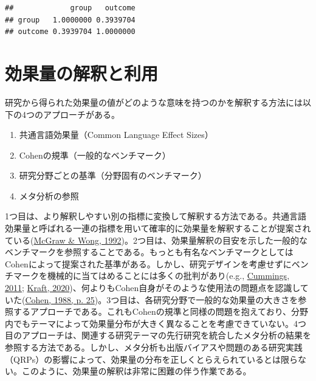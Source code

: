 \documentclass[
  ja=standard, xelatex, base=12pt]{bxjsreport}
\newenvironment{Shaded}{\begin{snugshade}}{\end{snugshade}}
\newcommand{\DecValTok}[1]{\textcolor[rgb]{0.00,0.00,0.81}{#1}}
\newcommand{\FunctionTok}[1]{\textcolor[rgb]{0.00,0.00,0.00}{#1}}
\newcommand{\NormalTok}[1]{#1}
\newcommand{\OtherTok}[1]{\textcolor[rgb]{0.56,0.35,0.01}{#1}}
\newcommand{\SpecialCharTok}[1]{\textcolor[rgb]{0.00,0.00,0.00}{#1}}
\providecommand{\tightlist}{%
  \setlength{\itemsep}{0pt}\setlength{\parskip}{0pt}}
\begin{document}
\begin{verbatim}
##             group   outcome
## group   1.0000000 0.3939704
## outcome 0.3939704 1.0000000
\end{verbatim}

\begin{Shaded}
\end{Shaded}

\hypertarget{ux52b9ux679cux91cfux306eux89e3ux91c8ux3068ux5229ux7528}{%
\chapter{効果量の解釈と利用}\label{ux52b9ux679cux91cfux306eux89e3ux91c8ux3068ux5229ux7528}}

研究から得られた効果量の値がどのような意味を持つのかを解釈する方法には以下の4つのアプローチがある。

\begin{enumerate}
\def\labelenumi{\arabic{enumi}.}
\tightlist
\item
  共通言語効果量（Common Language Effect Sizes）
\item
  Cohenの規準（一般的なベンチマーク）
\item
  研究分野ごとの基準（分野固有のベンチマーク）
\item
  メタ分析の参照
\end{enumerate}

1つ目は、より解釈しやすい別の指標に変換して解釈する方法である。共通言語効果量と呼ばれる一連の指標を用いて確率的に効果量を解釈することが提案されている(\protect\hyperlink{ref-mcgraw1992}{McGraw \& Wong, 1992})。2つ目は、効果量解釈の目安を示した一般的なベンチマークを参照することである。もっとも有名なベンチマークとしてはCohenによって提案された基準がある。しかし、研究デザインを考慮せずにベンチマークを機械的に当てはめることには多くの批判があり(e.g., \protect\hyperlink{ref-cummings2011}{Cummings, 2011}; \protect\hyperlink{ref-kraft2020}{Kraft, 2020})、何よりもCohen自身がそのような使用法の問題点を認識していた(\protect\hyperlink{ref-cohen1988}{Cohen, 1988, p. 25})。3つ目は、各研究分野で一般的な効果量の大きさを参照するアプローチである。これもCohenの規準と同様の問題を抱えており、分野内でもテーマによって効果量分布が大きく異なることを考慮できていない。4つ目のアプローチは、関連する研究テーマの先行研究を統合したメタ分析の結果を参照する方法である。しかし、メタ分析も出版バイアスや問題のある研究実践（QRPs）の影響によって、効果量の分布を正しくとらえられているとは限らない。このように、効果量の解釈は非常に困難の伴う作業である。
\end{document}
